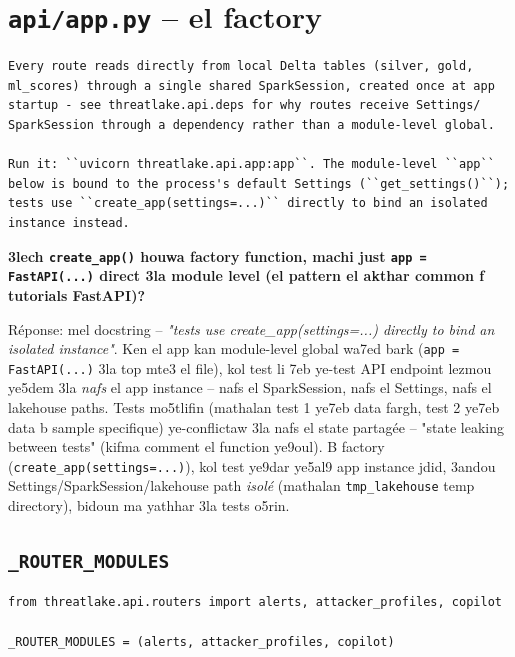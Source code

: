 \documentclass[11pt,a4paper]{report}
\DeclareRobustCommand{\code}[1]{\texttt{#1}}
\DeclareRobustCommand{\file}[1]{\texttt{\color{amber}#1}}
\begin{document}
\section{\file{api/app.py} -- el factory}

\begin{lstlisting}[style=pystyle]
Every route reads directly from local Delta tables (silver, gold,
ml_scores) through a single shared SparkSession, created once at app
startup - see threatlake.api.deps for why routes receive Settings/
SparkSession through a dependency rather than a module-level global.

Run it: ``uvicorn threatlake.api.app:app``. The module-level ``app``
below is bound to the process's default Settings (``get_settings()``);
tests use ``create_app(settings=...)`` directly to bind an isolated
instance instead.
\end{lstlisting}

\begin{soual}
\textbf{3lech \code{create\_app()} houwa factory function, machi just
\code{app = FastAPI(...)} direct 3la module level (el pattern el akthar
common f tutorials FastAPI)?}

Réponse: mel docstring -- \emph{"tests use create\_app(settings=...)
directly to bind an isolated instance"}. Ken el app kan module-level
global wa7ed bark (\code{app = FastAPI(...)} 3la top mte3 el file), kol
test li 7eb ye-test API endpoint lezmou ye5dem 3la \emph{nafs} el app
instance -- nafs el SparkSession, nafs el Settings, nafs el lakehouse
paths. Tests mo5tlifin (mathalan test 1 ye7eb data fargh, test 2 ye7eb
data b sample specifique) ye-conflictaw 3la nafs el state partagée --
"state leaking between tests" (kifma comment el function ye9oul). B
factory (\code{create\_app(settings=...)}), kol test ye9dar ye5al9 app
instance jdid, 3andou Settings/SparkSession/lakehouse path \emph{isolé}
(mathalan \code{tmp\_lakehouse} temp directory), bidoun ma yathhar 3la
tests o5rin.
\end{soual}

\subsection{\code{\_ROUTER\_MODULES}}

\begin{lstlisting}[style=pystyle]
from threatlake.api.routers import alerts, attacker_profiles, copilot

_ROUTER_MODULES = (alerts, attacker_profiles, copilot)
\end{lstlisting}
\end{document}
